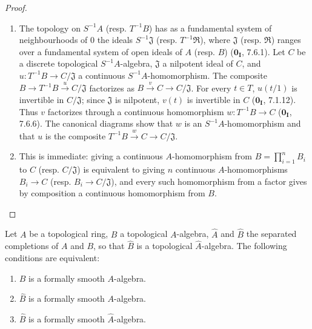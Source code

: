\begin{proof}
\begin{enumerate}
  \item[(iv)] The topology on $S^{-1}A$ (resp. $T^{-1}B$) has as a fundamental
  system of neighbourhoods of $0$ the ideals $S^{-1}\mathfrak{J}$ (resp.
  $T^{-1}\mathfrak{R}$), where $\mathfrak{J}$ (resp. $\mathfrak{R}$) ranges
  over a fundamental system of open ideals of $A$ (resp. $B$)
  ($\mathbf{0_I}$, 7.6.1). Let $C$ be a discrete topological
  $S^{-1}A$-algebra, $\mathfrak{J}$ a nilpotent ideal of $C$, and
  $u:T^{-1}B\to C/\mathfrak{J}$ a continuous $S^{-1}A$-homomorphism. The
  composite $B\to T^{-1}B\xrightarrow{u}C/\mathfrak{J}$ factorizes as
  $B\xrightarrow{v}C\to C/\mathfrak{J}$. For every $t\in T$, $u(t/1)$ is
  invertible in $C/\mathfrak{J}$; since $\mathfrak{J}$ is nilpotent, $v(t)$ is
  invertible in $C$ ($\mathbf{0_I}$, 7.1.12). Thus $v$ factorizes through a
  continuous homomorphism $w:T^{-1}B\to C$ ($\mathbf{0_I}$, 7.6.6). The
  canonical diagrams show that $w$ is an $S^{-1}A$-homomorphism and that
  $u$ is the composite $T^{-1}B\xrightarrow{w}C\to C/\mathfrak{J}$.

  \item[(v)] This is immediate: giving a continuous $A$-homomorphism from
  $B=\prod_{i=1}^n B_i$ to $C$ (resp. $C/\mathfrak{J}$) is equivalent to
  giving $n$ continuous $A$-homomorphisms $B_i\to C$ (resp.
  $B_i\to C/\mathfrak{J}$), and every such homomorphism from a factor gives by
  composition a continuous homomorphism from $B$.
\end{enumerate}
\end{proof}


\begin{proposition}[19.3.6]
\label{0.19.3.6}
Let $A$ be a topological ring, $B$ a topological $A$-algebra, $\widehat{A}$ and $\widehat{B}$ the separated completions of $A$ and $B$, so that $\widehat{B}$ is a topological $\widehat{A}$-algebra.
The following conditions are equivalent:
\begin{enumerate}
  \item[a)] $B$ is a formally smooth $A$-algebra.
  \item[b)] $\widehat{B}$ is a formally smooth $A$-algebra.
  \item[c)] $\widehat{B}$ is a formally smooth $\widehat{A}$-algebra.
\end{enumerate}
\end{proposition}

